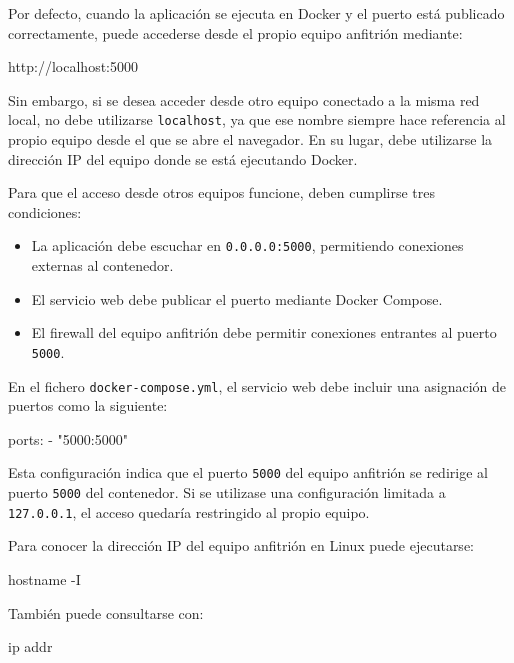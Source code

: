 Por defecto, cuando la aplicación se ejecuta en Docker y el puerto está publicado correctamente, puede accederse desde el propio equipo anfitrión mediante:

\begin{bloqueCodigo}[title={Acceso desde el equipo anfitrión}]
	http://localhost:5000
\end{bloqueCodigo}

Sin embargo, si se desea acceder desde otro equipo conectado a la misma red local, no debe utilizarse \texttt{localhost}, ya que ese nombre siempre hace referencia al propio equipo desde el que se abre el navegador. En su lugar, debe utilizarse la dirección IP del equipo donde se está ejecutando Docker.

Para que el acceso desde otros equipos funcione, deben cumplirse tres condiciones:

\begin{itemize}
	\item La aplicación debe escuchar en \texttt{0.0.0.0:5000}, permitiendo conexiones externas al contenedor.
	\item El servicio web debe publicar el puerto mediante Docker Compose.
	\item El firewall del equipo anfitrión debe permitir conexiones entrantes al puerto \texttt{5000}.
\end{itemize}

En el fichero \texttt{docker-compose.yml}, el servicio web debe incluir una asignación de puertos como la siguiente:

\begin{bloqueCodigo}[title={Publicación del puerto en Docker Compose}]
	ports:
	- "5000:5000"
\end{bloqueCodigo}

Esta configuración indica que el puerto \texttt{5000} del equipo anfitrión se redirige al puerto \texttt{5000} del contenedor. Si se utilizase una configuración limitada a \texttt{127.0.0.1}, el acceso quedaría restringido al propio equipo.

Para conocer la dirección IP del equipo anfitrión en Linux puede ejecutarse:

\begin{bloqueTerminal}[title={Consulta de IP en Linux}]
	hostname -I
\end{bloqueTerminal}

También puede consultarse con:

\begin{bloqueTerminal}[title={Consulta detallada de interfaces en Linux}]
	ip addr
\end{bloqueTerminal}


